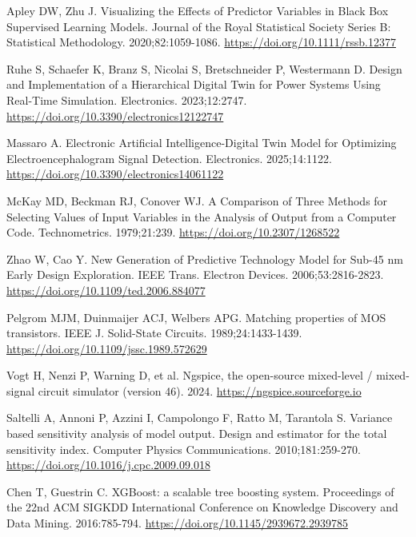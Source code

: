 Apley DW, Zhu J. Visualizing the Effects of Predictor Variables in Black Box Supervised Learning Models. Journal of the Royal Statistical Society Series B: Statistical Methodology. 2020;82:1059-1086.
\href{https://doi.org/10.1111/rssb.12377}{https://doi.org/10.1111/rssb.12377}

Ruhe S, Schaefer K, Branz S, Nicolai S, Bretschneider P, Westermann D. Design and Implementation of a Hierarchical Digital Twin for Power Systems Using Real-Time Simulation. Electronics. 2023;12:2747.
\href{https://doi.org/10.3390/electronics12122747}{https://doi.org/10.3390/electronics12122747}

Massaro A. Electronic Artificial Intelligence-Digital Twin Model for Optimizing Electroencephalogram Signal Detection. Electronics. 2025;14:1122.
\href{https://doi.org/10.3390/electronics14061122}{https://doi.org/10.3390/electronics14061122}

McKay MD, Beckman RJ, Conover WJ. A Comparison of Three Methods for Selecting Values of Input Variables in the Analysis of Output from a Computer Code. Technometrics. 1979;21:239.
\href{https://doi.org/10.2307/1268522}{https://doi.org/10.2307/1268522}

Zhao W, Cao Y. New Generation of Predictive Technology Model for Sub-45 nm Early Design Exploration. IEEE Trans. Electron Devices. 2006;53:2816-2823.
\href{https://doi.org/10.1109/ted.2006.884077}{https://doi.org/10.1109/ted.2006.884077}

Pelgrom MJM, Duinmaijer ACJ, Welbers APG. Matching properties of MOS transistors. IEEE J. Solid-State Circuits. 1989;24:1433-1439.
\href{https://doi.org/10.1109/jssc.1989.572629}{https://doi.org/10.1109/jssc.1989.572629}

Vogt H, Nenzi P, Warning D, et al. Ngspice, the open-source mixed-level / mixed-signal circuit simulator (version 46). 2024. \href{https://ngspice.sourceforge.io}{https://ngspice.sourceforge.io}

Saltelli A, Annoni P, Azzini I, Campolongo F, Ratto M, Tarantola S. Variance based sensitivity analysis of model output. Design and estimator for the total sensitivity index. Computer Physics Communications. 2010;181:259-270.
\href{https://doi.org/10.1016/j.cpc.2009.09.018}{https://doi.org/10.1016/j.cpc.2009.09.018}

Chen T, Guestrin C. XGBoost: a scalable tree boosting system. Proceedings of the 22nd ACM SIGKDD International Conference on Knowledge Discovery and Data Mining. 2016:785-794.
\href{https://doi.org/10.1145/2939672.2939785}{https://doi.org/10.1145/2939672.2939785}

